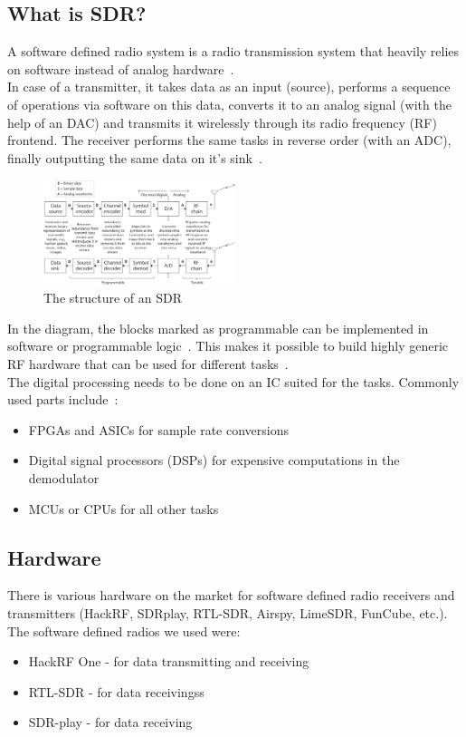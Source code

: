 \documentclass[conference]{IEEEtran}
\begin{document}
\subsection{What is SDR?}
A software defined radio system is a radio transmission system that heavily relies on software instead of analog hardware~\cite[1]{Heuberger2017}.\\
In case of a transmitter, it takes data as an input (source), performs a sequence of operations via software on this data, converts it to an analog signal (with the help of an DAC) and transmits it wirelessly through its radio frequency (RF) frontend. The receiver performs the same tasks in reverse order (with an ADC), finally outputting the same data on it's sink~\cite[5-6]{wyglinski2018software}.
\begin{figure}[H]
	\centering
	\includegraphics[width=0.5\textwidth]{forEngineers_SDR_structure}
	\caption{The structure of an SDR}
\end{figure}
In the diagram, the blocks marked as programmable can be implemented in software or programmable logic~\cite[5]{wyglinski2018software}. This makes it possible to build highly generic RF hardware that can be used for different tasks~\cite[4]{wyglinski2018software}.\\ 
The digital processing needs to be done on an IC suited for the tasks. Commonly used parts include~\cite[3]{Heuberger2017}:
\begin{itemize}
	\item FPGAs and ASICs for sample rate conversions
	\item Digital signal processors (DSPs) for expensive computations in the demodulator
	\item MCUs or CPUs for all other tasks
\end{itemize}

\subsection{Hardware}
There is various hardware on the market for software defined radio receivers and transmitters (HackRF, SDRplay, RTL-SDR, Airspy, LimeSDR, FunCube, etc.). The software defined radios we used were:
\begin{itemize}
	\item HackRF One - for data transmitting and receiving
	\item RTL-SDR - for data receivingss
	\item SDR-play - for data receiving
\end{itemize}
\bigbreak
\end{document}
